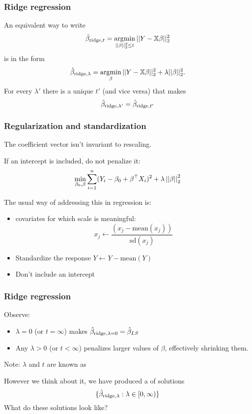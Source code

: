 \documentclass{beamer}
\begin{document}
\begin{frame}[fragile]
\frametitle{Ridge regression}
An equivalent way to write
\begin{equation}
\hat{\beta}_{\textrm{ridge},t} = \operatorname*{\arg\!\min}_{ || \beta ||_2^2 \leq t} ||Y - \mathbb{X}  \beta||_2^2
\label{eq:1}
\end{equation}
is in the  form
\begin{equation}
\hat{\beta}_{\textrm{ridge},\lambda} = \operatorname*{\arg\!\min}_{ \beta} ||Y - \mathbb{X}  \beta||_2^2 + \lambda || \beta ||_2^2.
\label{eq:2}
\end{equation}
For every $\lambda'$ there is a unique $t'$ (and vice versa) that makes 
\[
\hat{\beta}_{\textrm{ridge},\lambda'} = \hat{\beta}_{\textrm{ridge},t'}
\]
\end{frame}

\begin{frame}[fragile]
\frametitle{Regularization and standardization}
The coefficient vector isn't invariant to rescaling. 

\vsp
If an intercept is included, do not penalize it:
\[
\min_{\beta_0,\beta} \sum_{i=1}^n (Y_i - \beta_0 + \beta^{\top}X_i)^2 + \lambda \left|\left| \beta \right|\right|_2^2
\]

The usual way of addressing this in regression is:
\begin{itemize}
\item {}  covariates for which scale is meaningful:
\[
x_j \leftarrow \frac{(x_j - \textrm{mean}(x_j))}{\textrm{sd}(x_j)}
\]

\item Standardize the response $Y \leftarrow Y - \textrm{mean}(Y)$
\item Don't include an intercept

\end{itemize}
\end{frame}

\begin{frame}[fragile]
\frametitle{Ridge regression}

Observe:
\begin{itemize}
\item $\lambda = 0$ (or $t = \infty$) makes $\hat{\beta}_{\textrm{ridge},\lambda = 0} = \hat{\beta}_{LS}$
\item Any $\lambda > 0$ (or $t <\infty$)  penalizes larger values of $ \beta$, effectively shrinking them.
\end{itemize}

Note: $\lambda$ and $t$ are known as  


\vsp
However we think about it, we have produced a  of solutions
\[
\{\hat{\beta}_{\textrm{ridge},\lambda} : \lambda \in [0,\infty)\}
\]
What do these solutions look like?

\end{frame}
\end{document}
